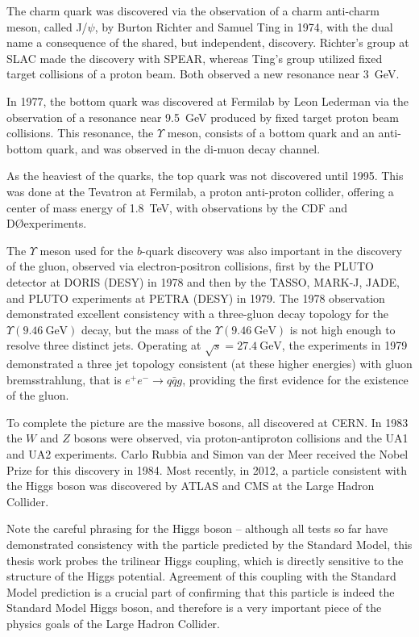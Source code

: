 The charm quark was discovered via the observation of a charm anti-charm meson, called J/$\psi$, by Burton Richter and 
Samuel Ting in 1974, with the dual name a consequence of the shared, but independent, discovery. Richter's group at SLAC 
made the discovery with SPEAR, whereas Ting's group utilized fixed target collisions 
of a proton beam. Both observed a new resonance near \SI{3}{\GeV}.

In 1977, the bottom quark was discovered at Fermilab by Leon Lederman via the observation of a resonance near 
\SI{9.5}{\GeV} produced by fixed target proton beam collisions. This resonance, the $\Upsilon$ meson, consists of 
a bottom quark and an anti-bottom quark, and was observed in the di-muon decay channel.

As the heaviest of the quarks, the top quark was not discovered until 1995. This was done at the Tevatron at Fermilab, a 
proton anti-proton collider, offering a center of mass energy of \SI{1.8}{\TeV}, with observations by the CDF and 
D\O\space experiments.

The $\Upsilon$ meson used for the $b$-quark discovery was also important in the discovery of the gluon, 
observed via electron-positron collisions, first by the 
PLUTO detector at DORIS (DESY) in 1978 and then by the TASSO, MARK-J, JADE, and PLUTO experiments at PETRA (DESY) in 1979. 
The 1978 observation demonstrated excellent consistency with a three-gluon decay topology for the 
$\Upsilon(\SI{9.46}{\GeV})$ decay, 
but the mass of the $\Upsilon(\SI{9.46}{\GeV})$ is not high enough to resolve three distinct jets. Operating at 
$\sqrt{s}=\SI{27.4}{\GeV}$, the experiments in 1979 demonstrated a three jet topology consistent (at these 
higher energies) with gluon bremsstrahlung, that is $e^{+}e^{-}\rightarrow q\bar{q}g$, providing the first evidence 
for the existence of the gluon.

To complete the picture are the massive bosons, all discovered at CERN. In 1983 the $W$ and $Z$ bosons were observed,
via proton-antiproton collisions and the UA1 and UA2 experiments. Carlo Rubbia and Simon van der Meer received the Nobel 
Prize for this discovery in 1984. Most recently, in 2012, a particle consistent with the Higgs boson was discovered by 
ATLAS and CMS at the Large Hadron Collider.

Note the careful phrasing for the Higgs boson -- although all tests so far have demonstrated consistency with 
the particle predicted by the Standard Model, this thesis work probes the trilinear Higgs coupling, which is directly 
sensitive to the structure of the Higgs potential. Agreement of this coupling with the Standard Model prediction 
is a crucial part of confirming that this particle is indeed the Standard Model Higgs boson, and therefore is 
a very important piece of the physics goals of the Large Hadron Collider.

